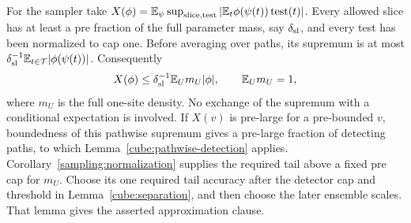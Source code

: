 For the sampler take
$X(\phi)=\mathbb E_\psi\sup_{\text{slice,test}}
|\mathbb E_t\phi(\psi(t))\operatorname{test}(t)|$.
Every allowed slice has at least a pre fraction of the full
parameter mass, say $\delta_{\rm sl}$, and every test has been
normalized to cap one.  Before averaging over paths, its supremum
is at most $\delta_{\rm sl}^{-1}\mathbb E_{t\in\mathcal T}
|\phi(\psi(t))|$.  Consequently
\[
 X(\phi)\le\delta_{\rm sl}^{-1}\mathbb E_Um_U|\phi|,
                         \qquad \mathbb E_Um_U=1,
\]
where $m_U$ is the full one-site density.  No exchange of the
supremum with a conditional expectation is involved.  If $X(v)$ is
pre-large for a pre-bounded $v$, boundedness of this pathwise
supremum gives a pre-large fraction of detecting paths, to which
Lemma~\ref{cube:pathwise-detection} applies.
Corollary~\ref{sampling:normalization}
supplies the required tail above a fixed pre cap for $m_U$.
Choose its one required tail accuracy after the detector cap and
threshold in Lemma~\ref{cube:separation}, and then choose the later
ensemble scales.  That lemma gives the asserted approximation clause.
